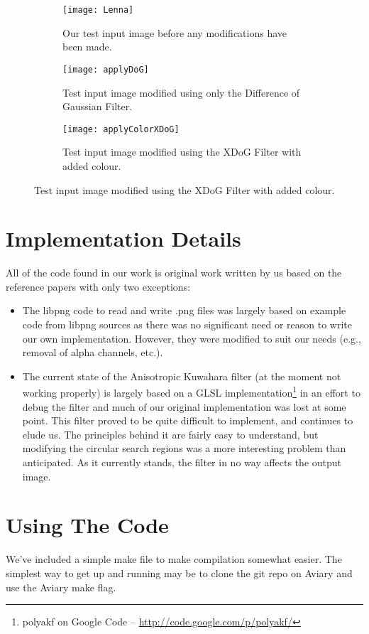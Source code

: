 \documentclass[10pt]{article}
\begin{document}
\begin{figure}
\centering
\begin{subfigure}[b]{0.45\textwidth}
	\texttt{[image: Lenna]}
	\caption{Our test input image before any modifications have been made.}
\end{subfigure}
\begin{subfigure}[b]{0.45\textwidth}
	\texttt{[image: applyDoG]}
	\caption{Test input image modified using only the Difference of Gaussian Filter.}
\end{subfigure}
\begin{subfigure}[b]{0.45\textwidth}
	\texttt{[image: applyColorXDoG]}
	\caption{Test input image modified using the XDoG Filter with added colour.}
\end{subfigure}
\end{figure}

\section{Implementation Details}

All of the code found in our work is original work written by us based on the reference papers with only two exceptions:

\begin{itemize}
\item The libpng code to read and write .png files was largely based on example code from libpng sources as there was no significant need or reason to write our own implementation. However, they were modified to suit our needs (e.g., removal of alpha channels, etc.).

\item The current state of the Anisotropic Kuwahara filter (at the moment not working properly) is largely based on a GLSL implementation\footnote{polyakf on Google Code -- \url{http://code.google.com/p/polyakf/}} in an effort to debug the filter and much of our original implementation was lost at some point. This filter proved to be quite difficult to implement, and continues to elude us. The principles behind it are fairly easy to understand, but modifying the circular search regions was a more interesting problem than anticipated. As it currently stands, the filter in no way affects the output image.
\end{itemize}


\section{Using The Code}
We've included a simple make file to make compilation somewhat easier. The simplest way to get up and running may be to clone the git repo on Aviary and use the Aviary make flag.
\end{document}
